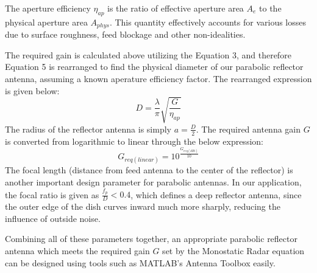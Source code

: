 \documentclass[a4paper]{article}
\begin{document}
	The aperture efficiency $\eta_{ap}$ is the ratio of effective aperture area $A_e$ to the physical aperture area $A_{phys}$. This quantity effectively accounts for various losses due to surface roughness, feed blockage and other non-idealities. 
	
	The required gain is calculated above utilizing the Equation 3, and therefore Equation 5 is rearranged to find the physical diameter of our parabolic reflector antenna, assuming a known aperature efficiency factor. The rearranged expression is given below:
	\begin{equation}
		D = \frac{\lambda}{\pi} \sqrt{\frac{G}{\eta_{ap}}}
	\end{equation}
	The radius of the reflector antenna is simply $a = \frac{D}{2}$. The required antenna gain $G$ is converted from logarithmic to linear through the below expression:
	\begin{equation}
		G_{req (linear)} = 10^{\frac{G_{req (dBi)}}{10}}
	\end{equation}
	The focal length (distance from feed antenna to the center of the reflector) is another important design parameter for parabolic antennas. In our application, the focal ratio is given as $\frac{f_p}{D} < 0.4$, which defines a deep reflector antenna, since the outer edge of the dish curves inward much more sharply, reducing the influence of outside noise. 
	
	Combining all of these parameters together, an appropriate parabolic reflector antenna which meets the required gain $G$ set by the Monostatic Radar equation can be designed using tools such as MATLAB's Antenna Toolbox easily.
	
\end{document}
